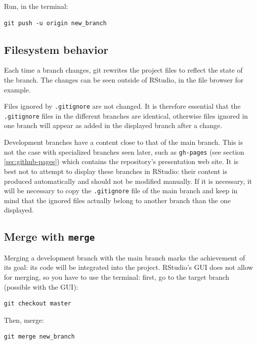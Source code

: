 \documentclass[
  12pt,
  american,
  a4paper,
  extrafontsizes,onecolumn,openright
  ]{memoir}
\begin{document}
Run, in the terminal:

\begin{verbatim}
git push -u origin new_branch
\end{verbatim}

\subsection{Filesystem behavior}\label{filesystem-behavior}

Each time a branch changes, git rewrites the project files to reflect the state of the branch.
The changes can be seen outside of RStudio, in the file browser for example.

Files ignored by \texttt{.gitignore} are not changed.
It is therefore essential that the \texttt{.gitignore} files in the different branches are identical, otherwise files ignored in one branch will appear as added in the displayed branch after a change.

Development branches have a content close to that of the main branch.
This is not the case with specialized branches seen later, such as \texttt{gh-pages} (see section \ref{sec:github-pages}) which contains the repository's presentation web site.
It is best not to attempt to display these branches in RStudio: their content is produced automatically and should not be modified manually.
If it is necessary, it will be necessary to copy the \texttt{.gitignore} file of the main branch and keep in mind that the ignored files actually belong to another branch than the one displayed.

\subsection{\texorpdfstring{Merge with \texttt{merge}}{Merge with merge}}\label{merge-with-merge}

Merging a development branch with the main branch marks the achievement of its goal: its code will be integrated into the project.
RStudio's GUI does not allow for merging, so you have to use the terminal: first, go to the target branch (possible with the GUI):

\begin{verbatim}
git checkout master
\end{verbatim}

Then, merge:

\begin{verbatim}
git merge new_branch
\end{verbatim}
\end{document}
